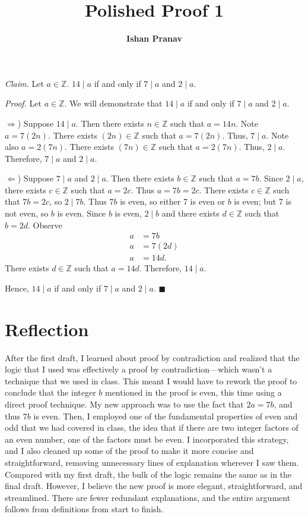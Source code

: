 \documentclass[9pt]{article}
\title{Polished Proof 1}
\author{\textbf{Ishan Pranav}}
\begin{document}
\maketitle
\noindent\textit{Claim. }Let $a\in \mathbb{Z}$. $14\mid a$ if and only if $7\mid a$ and $2\mid a$.
\newline

\noindent\textit{Proof. }Let $a\in\mathbb{Z}$. We will demonstrate that $14\mid a$ if and only if $7\mid a$ and $2\mid a$.
\newline

\noindent$\Rightarrow$) Suppose $14\mid a$. Then there exists $n\in\mathbb{Z}$ such that $a=14n$. Note $a=7(2n)$. There exists $(2n)\in\mathbb{Z}$ such that $a=7(2n)$. Thus, $7\mid a$. Note also $a=2(7n)$. There exists $(7n)\in\mathbb{Z}$ such that $a=2(7n)$. Thus, $2\mid a$. Therefore, $7\mid a$ and $2\mid a$. 
\newline

\noindent$\Leftarrow$) Suppose $7\mid a$ and $2\mid a$. Then there exists $b\in\mathbb{Z}$ such that $a=7b$. Since $2\mid a$, there exists $c\in\mathbb{Z}$ such that $a=2c$. Thus $a=7b=2c$. There exists $c\in\mathbb{Z}$ such that $7b=2c$, so $2\mid 7b$. Thus $7b$ is even, so either 7 is even or $b$ is even; but 7 is not even, so $b$ is even. Since $b$ is even, $2\mid b$ and there exists $d\in\mathbb{Z}$ such that $b=2d$. Observe
\begin{align*}
a&=7b\\
a&=7(2d)\\
a&=14d.
\end{align*}
There exists $d\in\mathbb{Z}$ such that $a=14d$. Therefore, $14\mid a$.
\newline

\noindent Hence, $14\mid a$ if and only if $7\mid a$ and $2\mid a$.$\,\,\blacksquare$
\section*{Reflection}
After the first draft, I learned about proof by contradiction and realized that the logic that I used was effectively a proof by contradiction---which wasn't a technique that we used in class. This meant I would have to rework the proof to conclude that the integer $b$ mentioned in the proof is even, this time using a direct proof technique. My new approach was to use the fact that $2a=7b$, and thus $7b$ is even. Then, I employed one of the fundamental properties of even and odd that we had covered in class, the idea that if there are two integer factors of an even number, one of the factors must be even. I incorporated this strategy, and I also cleaned up some of the proof to make it more concise and straightforward, removing unnecessary lines of explanation wherever I saw them. Compared with my first draft, the bulk of the logic remains the same as in the final draft. However, I believe the new proof is more elegant, straightforward, and streamlined. There are fewer redundant explanations, and the entire argument follows from definitions from start to finish.
\end{document}

